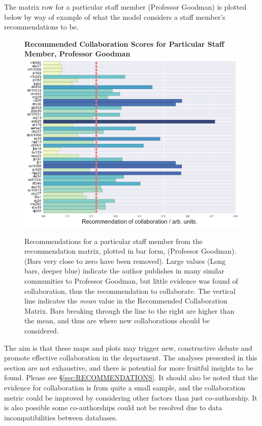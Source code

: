 The matrix row for a particular staff member (Professor Goodman) is plotted below by way of example of what the model considers a staff member's recommendations to be.
\begin{center}
\begin{figure}[H]
  \centering
  \textbf{Recommended Collaboration Scores for Particular Staff Member, Professor Goodman}
    \includegraphics[width=\textwidth]{Analysis/jmg_dots_line.png}
    \caption[Recommended Collaboration Scores for Particular Staff Member]{Recommendations for a particular staff member from the recommendation matrix, plotted in bar form, (Professor Goodman). (Bars very close to zero have been removed). Large values (Long bars, deeper blue) indicate the author publishes in many similar communities to Professor Goodman, but little evidence was found of collaboration, thus the recommendation to collaborate. The vertical line indicates the \emph{mean} value in the Recommended Collaboration Matrix. Bars breaking through the line to the right are higher than the mean, and thus are where new collaborations should be considered.}
    \label{fig:RECOMM_BAR}
\end{figure} 
\end{center}
The aim is that these maps and plots may trigger new, constructive debate and promote effective collaboration in the department. The analyses presented in this section are not exhaustive, and there is potential for more fruitful insights to be found. Please see \S\ref{sec:RECOMMENDATIONS}. It should also be noted that the evidence for collaboration is from quite a small sample, and the collaboration metric could be improved by considering other factors than just co-authorship. It is also possible some co-authorships could not be resolved due to data incompatibilities between databases.

